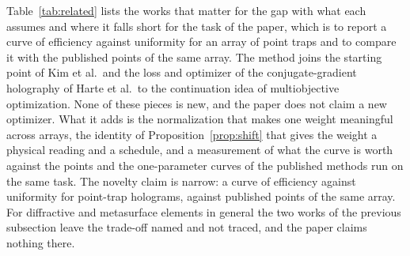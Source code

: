 Table~\ref{tab:related} lists the works that matter for the gap with what each assumes and where it falls short for the task of the paper, which is to report a curve of efficiency against uniformity for an array of point traps and to compare it with the published points of the same array.
The method joins the starting point of Kim et al.\ and the loss and optimizer of the conjugate-gradient holography of Harte et al.\ to the continuation idea of multiobjective optimization. None of these pieces is new, and the paper does not claim a new optimizer. What it adds is the normalization that makes one weight
meaningful across arrays, the identity of Proposition~\ref{prop:shift} that gives the weight a physical reading and a schedule, and a measurement of what the curve is worth against the points and the one-parameter curves of the published methods run on the same task. The novelty claim is narrow: a curve of efficiency against uniformity for point-trap holograms, against published points of the same array. For diffractive and metasurface elements in general the two works of the previous subsection leave the trade-off named and not traced, and the paper claims nothing there.

